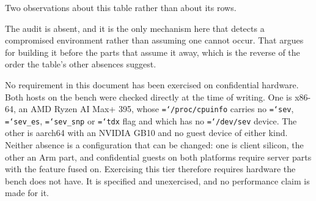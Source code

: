 \documentclass[11pt,a4paper]{article}
\newcommand{\code}[1]{\texttt{\hyphenchar\font=`\-\relax #1}}
\begin{document}
Two observations about this table rather than about its rows.

The audit is absent, and it is the only mechanism here that detects a compromised
environment rather than assuming one cannot occur. That argues for building it before
the parts that assume it away, which is the reverse of the order the table's other
absences suggest.

No requirement in this document has been exercised on confidential hardware. Both
hosts on the bench were checked directly at the time of writing. One is x86-64, an
AMD Ryzen AI Max+ 395, whose \code{/proc/cpuinfo} carries no \code{sev},
\code{sev\_es}, \code{sev\_snp} or \code{tdx} flag and which has no \code{/dev/sev}
device. The other is aarch64 with an NVIDIA GB10 and no guest device of either kind.
Neither absence is a configuration that can be changed: one is client silicon, the
other an Arm part, and confidential guests on both platforms require server parts
with the feature fused on. Exercising this tier therefore requires hardware the bench
does not have. It is specified and unexercised, and no performance claim is made for
it.
\end{document}
